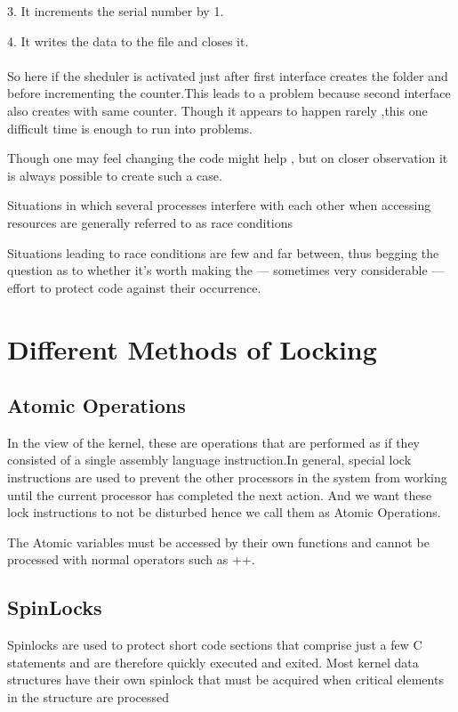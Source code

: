\documentclass[a4paper]{article}
\begin{document}
3. It increments the serial number by 1.

4. It writes the data to the file and closes it.
\\~\\
So here if the sheduler is activated just after first interface creates  the folder and before incrementing the counter.This leads to a problem because second interface also creates with same counter. Though it appears to happen rarely ,this one difficult time is enough to run into  problems.   

Though one may feel changing the code might help , but on closer observation it is always possible to create such a case.

Situations in which several processes interfere with each other when accessing resources are generally
referred to as race conditions

Situations leading to race conditions are few and far between, thus begging the question as to whether
it’s worth making the — sometimes very considerable — effort to protect code against their occurrence.


\section{Different Methods of Locking}

\subsection{Atomic Operations}

In the view of the kernel, these are operations that are performed as if they consisted
of a single assembly language instruction.In general, special lock instructions are used to prevent the other processors in the system from working
until the current processor has completed the next action. And we want these lock instructions to not be disturbed hence we call them as Atomic Operations.

The Atomic variables must be accessed by their own functions and cannot be processed with normal operators such as ++.

\subsection{SpinLocks}

Spinlocks are used to protect short code sections that comprise just a few C statements and are therefore
quickly executed and exited. Most kernel data structures have their own spinlock that must be acquired
when critical elements in the structure are processed
\end{document}
